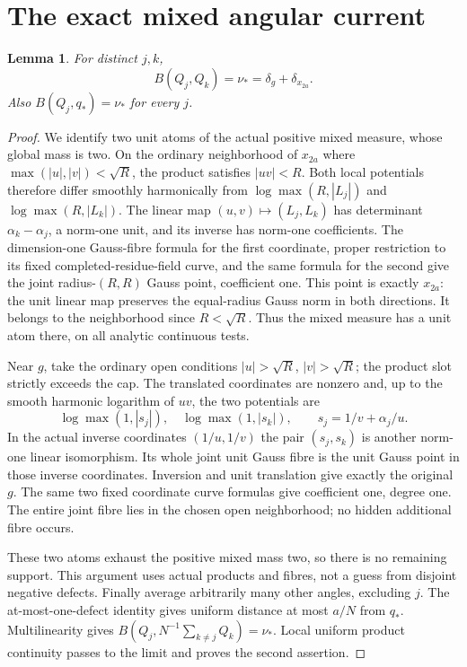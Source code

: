 \documentclass[11pt]{article}
\newtheorem{lemma}[theorem]{Lemma}
\begin{document}
\section{The exact mixed angular current}
\begin{lemma}\label{mixed}
For distinct $j,k$,
\[
 B(Q_j,Q_k)=\nu_*=\delta_g+\delta_{x_{2a}}.
\]
Also $B(Q_j,q_*)=\nu_*$ for every $j$.
\end{lemma}
\begin{proof}
We identify two unit atoms of the actual positive mixed measure, whose
global mass is two. On the ordinary neighborhood of $x_{2a}$ where
$\max(|u|,|v|)<\sqrt R$, the product satisfies $|uv|<R$.
Both local potentials therefore differ smoothly harmonically from
$\log\max(R,|L_j|)$ and $\log\max(R,|L_k|)$.
The linear map $(u,v)\mapsto(L_j,L_k)$ has determinant
$\alpha_k-\alpha_j$, a norm-one unit, and its inverse has norm-one
coefficients. The dimension-one Gauss-fibre formula for the first
coordinate, proper restriction to its fixed completed-residue-field
curve, and the same formula for the second give the joint radius-$(R,R)$
Gauss point, coefficient one. This point is exactly $x_{2a}$: the unit
linear map preserves the equal-radius Gauss norm in both directions.
It belongs to the neighborhood since $R<\sqrt R$. Thus the mixed
measure has a unit atom there, on all analytic continuous tests.

Near $g$, take the ordinary open conditions
$|u|>\sqrt R$, $|v|>\sqrt R$; the product slot strictly exceeds the cap.
The translated coordinates are nonzero and, up to the smooth harmonic
logarithm of $uv$, the two potentials are
\[
 \log\max(1,|s_j|),\quad\log\max(1,|s_k|),
 \qquad s_j=1/v+\alpha_j/u.
\]
In the actual inverse coordinates $(1/u,1/v)$ the pair $(s_j,s_k)$
is another norm-one linear isomorphism. Its whole joint unit Gauss fibre
is the unit Gauss point in those inverse coordinates. Inversion and unit
translation give exactly the original $g$. The same two fixed coordinate
curve formulas give coefficient one, degree one. The entire joint fibre
lies in the chosen open neighborhood; no hidden additional fibre occurs.

These two atoms exhaust the positive mixed mass two, so there is no
remaining support. This argument uses actual products and fibres,
not a guess from disjoint negative defects. Finally average arbitrarily
many other angles, excluding $j$. The at-most-one-defect identity gives
uniform distance at most $a/N$ from $q_*$. Multilinearity gives
$B(Q_j,N^{-1}\sum_{k\ne j}Q_k)=\nu_*$. Local uniform product continuity
passes to the limit and proves the second assertion.
\end{proof}
\end{document}
